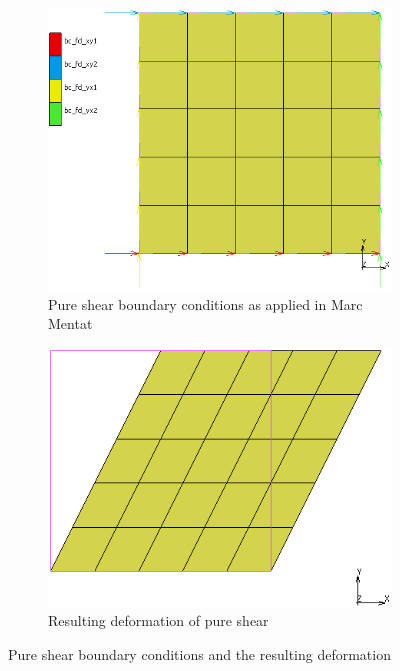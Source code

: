 \begin{figure}[H]
	\centering
	\begin{subfigure}[b]{0.4\textwidth}
		\centering
		\includegraphics[width=\textwidth]{C3BC.png}
		\caption{Pure shear boundary conditions as applied in Marc Mentat}
		\label{fig:c3bc}
	\end{subfigure}
	\hfill
	\begin{subfigure}[b]{0.45\textwidth}
		\centering
		\includegraphics[width=\textwidth]{C3Def.png}
		\caption{Resulting deformation of pure shear}
		\label{fig:c3def}
	\end{subfigure}
	\caption[Pure shear boundary conditions and deformation]{Pure shear boundary conditions and the resulting deformation}
	\label{fig:c3}
\end{figure}

